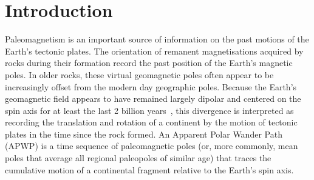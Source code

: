 \section{Introduction}

Paleomagnetism is an important source of information on the past motions of the
Earth's tectonic plates. The orientation of remanent magnetisations acquired by
rocks during their formation record the past position of the Earth's magnetic
poles. In older rocks, these virtual geomagnetic poles often appear to be
increasingly offset from the modern day geographic poles. Because the Earth's
geomagnetic field appears to have remained largely dipolar and centered on the
spin axis for at least the last 2 billion years~\cite{E06}, this divergence is
interpreted as recording the translation and rotation of a continent by the
motion of tectonic plates in the time since the rock formed. An Apparent Polar
Wander Path (APWP) is a time sequence of paleomagnetic poles (or, more commonly,
mean poles that average all regional paleopoles of similar age) that traces
the cumulative motion of a continental fragment relative to the Earth's spin
axis.

